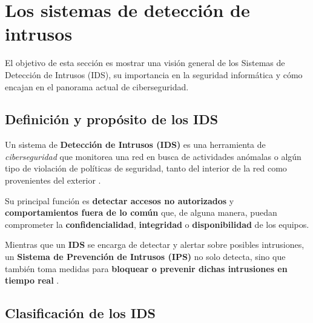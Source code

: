 \documentclass[11pt,a4paper,twoside]{report}
\begin{document}
\section{Los sistemas de detección de intrusos}

El objetivo de esta sección es mostrar una visión general de los Sistemas de Detección de Intrusos (IDS), su importancia en la seguridad informática y cómo encajan en el panorama actual de ciberseguridad.

\subsection{Definición y propósito de los IDS}

Un sistema de \textbf{Detección de Intrusos (IDS)} es una herramienta de \textit{ciberseguridad} que monitorea una red en busca de actividades anómalas o algún tipo de violación de políticas de seguridad, tanto del interior de la red como provenientes del exterior \cite{cichonski2012guide}.\newline

Su principal función es \textbf{detectar accesos no autorizados} y \textbf{comportamientos fuera de lo común} que, de alguna manera, puedan comprometer la \textbf{confidencialidad}, \textbf{integridad} o \textbf{disponibilidad} de los equipos.\newline

Mientras que un \textbf{IDS} se encarga de detectar y alertar sobre posibles intrusiones, un \textbf{Sistema de Prevención de Intrusos (IPS)} no solo detecta, sino que también toma medidas para \textbf{bloquear o prevenir dichas intrusiones en tiempo real} \cite{abbas2023ids}.

\subsection{Clasificación de los IDS}
\end{document}
